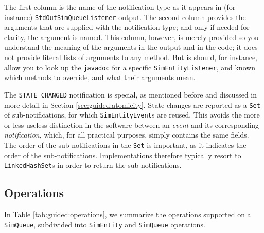 \documentclass[12pt]{book}
\begin{document}
The first column is the name of the notification type
  as it appears in (for instance) \lstinline|StdOutSimQueueListener|
  output.
The second column provides the arguments
  that are supplied with the notification type;
  and only if needed for clarity, the argument is named.
This column, however,
  is merely provided so you understand the meaning of the
  arguments in the output
  and in the code;
  it does not provide literal lists of arguments to any method.
But is should, for instance, allow you
  to look up the \lstinline|javadoc|
  for a specific \lstinline|SimEntityListener|,
  and known which methods to override,
  and what their arguments mean.

The \lstinline|STATE CHANGED| notification is special,
  as mentioned before and
  discussed in more detail
  in Section \ref{sec:guided:atomicity}.
State changes are reported
  as a \lstinline|Set| of sub-notifications,
  for which \lstinline|SimEntityEvent|s
  are reused.
This avoids the more or less useless
  distinction in the software between
  an {\em event\/}
  and its corresponding {\em notification},
  which, for all practical purposes,
  simply contains the same fields.
The order of the sub-notifications
  in the \lstinline|Set| is important,
  as it indicates the order of
  the sub-notifications.
Implementations therefore typically
  resort to \lstinline|LinkedHashSet|s
  in order to return the sub-notifications.

\subsection{Operations}

In Table \ref{tab:guided:operations},
  we summarize the operations supported on a \lstinline|SimQueue|,
  subdivided into \lstinline|SimEntity|
  and \lstinline|SimQueue| operations.
\end{document}
